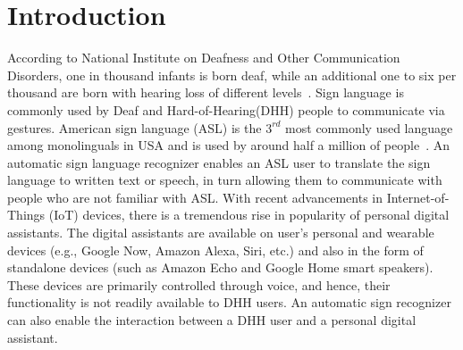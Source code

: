 \documentclass[10pt,twocolumn,letterpaper]{article}
\begin{document}
\section{Introduction}

According to National Institute on Deafness and Other Communication Disorders, one in thousand infants is born deaf, while an additional one to six per thousand are born with hearing loss of different levels~\cite{3072291}. Sign language is commonly used by Deaf and Hard-of-Hearing(DHH) people to communicate via gestures. American sign language (ASL) is the $3^{rd}$ most commonly used language among monolinguals in USA and is used by around half a million of people~\cite{sign_lang_study}. An automatic sign language recognizer enables an ASL user to translate the sign language to written text or speech, in turn allowing them to communicate with people who are not familiar with ASL. With recent advancements in Internet-of-Things (IoT) devices, there is a tremendous rise in popularity of personal digital assistants. The digital assistants are available on user's personal and wearable devices (e.g., Google Now, Amazon Alexa, Siri, etc.) and also in the form of standalone devices (such as Amazon Echo and Google Home smart speakers). These devices are primarily controlled through voice, and hence, their functionality is not readily available to DHH users. An automatic sign recognizer can also enable the interaction between a DHH user and a personal digital assistant. 

\end{document}
